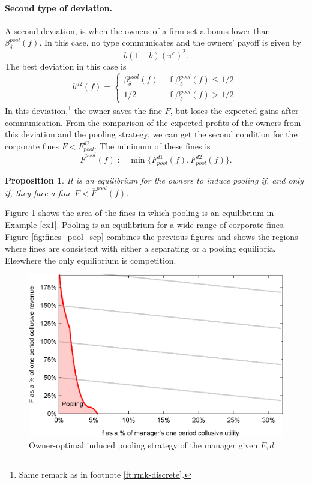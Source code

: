 \documentclass[]{article}
\newtheorem{proposition}{Proposition}
\begin{document}
\paragraph{Second type of deviation.} A second deviation, is when the owners of a firm set a bonus lower than $\beta^{pool}_{\delta}(f)$. In this case, no type communicates and the owners' payoff is given by
\begin{equation*}
    b(1-b)(\pi^c)^2.
\end{equation*}
The best deviation in this case is
\begin{equation}\label{pool-dev_2}
b^{d2}(f) = 
\begin{cases}
\beta^{pool}_\delta(f) & \text{ if }\beta^{pool}_\delta(f)  \leq  1/2 \\
1/2 & \text{ if }\beta^{pool}_\delta(f)>1/2.
\end{cases}
\end{equation}
In this deviation,\footnote{%
Same remark as in footnote \ref{ft:rmk-discrete}.} the owner saves the fine $F$, but loses the expected gains after communication. From the comparison of the expected profits of the owners from this deviation and the pooling strategy, we can get the second condition for the corporate fines $F<{F}^{d2}_{pool}$. The minimum of these fines is $$\overline{F}^{pool}(f):=\min\{{F}^{d1}_{pool}(f), F^{d2}_{pool}(f)\}.$$

\begin{proposition}\label{prop:pooling-owners-managers}
It is an equilibrium for the owners to induce pooling if, and only if, they face a fine $F<\overline{F}^{pool}(f)$.
\end{proposition}

Figure \ref{fig:fines_pool} shows the area of the fines in which pooling is an equilibrium in Example \ref{ex1}. Pooling is an equilibrium for a wide range of corporate fines. Figure \ref{fig:fines_pool_sep} combines the previous figures and shows the regions where fines are consistent with either a separating or a pooling equilibria. Elsewhere the only equilibrium is competition. 

\begin{figure}
\centering
\includegraphics[scale=0.8]{Plots/Bertrand_com_f_F_Pool.eps}
\caption{Owner-optimal induced pooling strategy of the manager given $F,d$.}\label{fig:fines_pool}
\end{figure}
\end{document}
